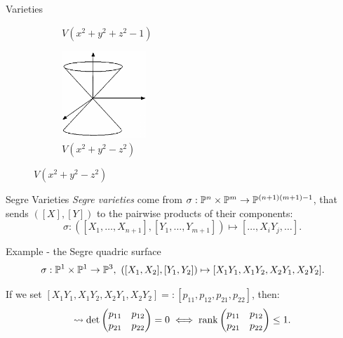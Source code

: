\begin{frame}{Varieties}
\begin{figure}
\begin{subfigure}[b]{0.475\textwidth}
            \caption[]%
            {{\small $V(x^{2} + y^{2} + z^{2} - 1)$}}    
        \end{subfigure}
        \hfill
        \begin{subfigure}[b]{0.475\textwidth}   
            \centering 
            \includegraphics[width=0.35\textwidth]{resources/cone}
            \caption[]%
            {{\small $V(x^{2} + y^{2} - z^{2})$}}    
        \end{subfigure}
    \end{figure}

\end{frame}

\begin{frame}{Segre Varieties}
        \emph{Segre varieties} come from $\sigma: \mathbb{P}^{n} \times \mathbb{P}^{m} \rightarrow \mathbb{P}^{(n+1)(m+1) - 1}$, that sends $([X],[Y])$ to the pairwise products of their components:
            $$ \sigma : ([X_{1}, \ldots, X_{n+1}], [Y_{1}, \ldots, Y_{m+1}]) \mapsto [\ldots, X_{i}Y_{j}, \ldots ]. $$

        \begin{block}{Example - the Segre quadric surface}
        \vspace{-24pt}
        $$\sigma : \PP^{1} \times \PP^{1} \ra \PP^{3},\ ([X_{1}, X_{2}], [Y_{1}, Y_{2}]) \mapsto [ X_{1}Y_{1}, X_{1}Y_{2}, X_{2}Y_{1}, X_{2}Y_{2} ]. $$
        
        If we set $[ X_{1}Y_{1}, X_{1}Y_{2}, X_{2}Y_{1}, X_{2}Y_{2} ] =: [p_{11}, p_{12}, p_{21}, p_{22}]$, then:
        $$ \rightsquigarrow \det \begin{pmatrix} p_{11} & p_{12} \\ p_{21} & p_{22} \end{pmatrix} = 0 \iff \rank \begin{pmatrix} p_{11} & p_{12} \\ p_{21} & p_{22} \end{pmatrix} \leq 1. $$
        \end{block}
\end{frame}

